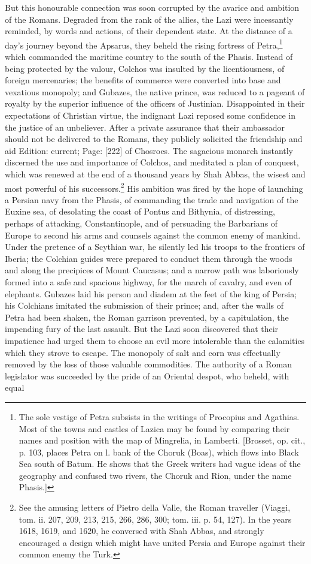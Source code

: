 But this honourable connection was soon corrupted by the avarice and ambition of the Romans. Degraded from the rank of the allies, the Lazi were incessantly reminded, by words and actions, of their dependent state. At the distance of a day\texthebrew{}’s journey beyond the Apsarus, they beheld the rising fortress of Petra,\footnote{The sole vestige of Petra subsists in the writings of Procopius and Agathias. Most of the towns and castles of Lazica may be found by comparing their names and position with the map of Mingrelia, in Lamberti. [Brosset, op. cit., p. 103, places Petra on l. bank of the Choruk (Boas), which flows into Black Sea south of Batum. He shows that the Greek writers had vague ideas of the geography and confused two rivers, the Choruk and Rion, under the name Phasis.]} which commanded the maritime country to the south of the Phasis. Instead of being protected by the valour, Colchos was insulted by the licentiousness, of foreign mercenaries; the benefits of commerce were converted into base and vexatious monopoly; and Gubazes, the native prince, was reduced to a pageant of royalty by the superior influence of the officers of Justinian. Disappointed in their expectations of Christian virtue, the indignant Lazi reposed some confidence in the justice of an unbeliever. After a private assurance that their ambassador should not be delivered to the Romans, they publicly solicited the friendship and aid Edition: current; Page: [222] of Chosroes. The sagacious monarch instantly discerned the use and importance of Colchos, and meditated a plan of conquest, which was renewed at the end of a thousand years by Shah Abbas, the wisest and most powerful of his successors.\footnote{See the amusing letters of Pietro della Valle, the Roman traveller (Viaggi, tom. ii. 207, 209, 213, 215, 266, 286, 300; tom. iii. p. 54, 127). In the years 1618, 1619, and 1620, he conversed with Shah Abbas, and strongly encouraged a design which might have united Persia and Europe against their common enemy the Turk.} His ambition was fired by the hope of launching a Persian navy from the Phasis, of commanding the trade and navigation of the Euxine sea, of desolating the coast of Pontus and Bithynia, of distressing, perhaps of attacking, Constantinople, and of persuading the Barbarians of Europe to second his arms and counsels against the common enemy of mankind. Under the pretence of a Scythian war, he silently led his troops to the frontiers of Iberia; the Colchian guides were prepared to conduct them through the woods and along the precipices of Mount Caucasus; and a narrow path was laboriously formed into a safe and spacious highway, for the march of cavalry, and even of elephants. Gubazes laid his person and diadem at the feet of the king of Persia; his Colchians imitated the submission of their prince; and, after the walls of Petra had been shaken, the Roman garrison prevented, by a capitulation, the impending fury of the last assault. But the Lazi soon discovered that their impatience had urged them to choose an evil more intolerable than the calamities which they strove to escape. The monopoly of salt and corn was effectually removed by the loss of those valuable commodities. The authority of a Roman legislator was succeeded by the pride of an Oriental despot, who beheld, with equal 